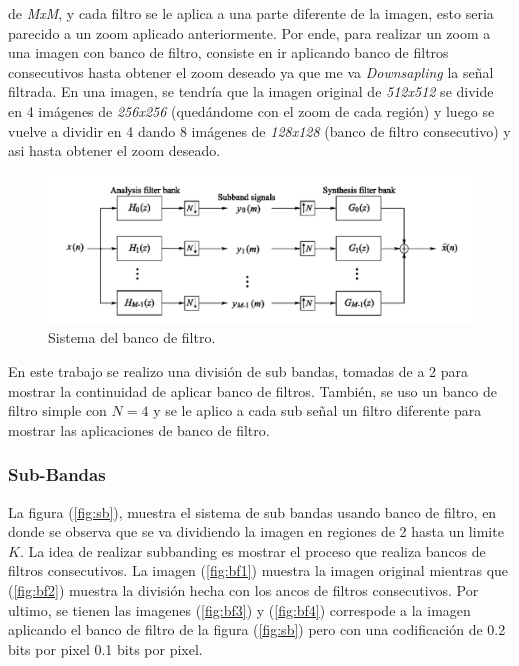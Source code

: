de \textit{MxM}, y cada filtro se le aplica a una parte diferente de la imagen, esto seria parecido a un zoom aplicado anteriormente. Por ende, para realizar un zoom a una imagen con banco de filtro, consiste en ir aplicando banco de filtros consecutivos hasta obtener el zoom deseado ya que me va \textit{Downsapling} la señal filtrada. En una imagen, se tendría que la imagen original de \textit{512x512} se divide en 4 imágenes de \textit{256x256} (quedándome con el zoom de cada región) y luego se vuelve a dividir en 4 dando 8 imágenes de \textit{128x128} (banco de filtro consecutivo) y asi hasta obtener el zoom deseado. 

\begin{figure}[H]
	\centering
	\includegraphics[scale=0.5]{imagenes/bancoFiltro.png}
	\caption{Sistema del banco de filtro\label{fig:bf}.}
\end{figure}

En este trabajo se realizo una división de sub bandas, tomadas de a 2 para mostrar la continuidad de aplicar banco de filtros. También, se uso un banco de filtro simple con $N=4$ y se le aplico a cada sub señal un filtro diferente para mostrar las aplicaciones de banco de filtro.

\subsubsection{Sub-Bandas}


	La figura (\ref{fig:sb}), muestra el sistema de sub bandas usando banco de filtro, en donde se observa que se va dividiendo la imagen en regiones de 2 hasta un limite $K$. La idea de realizar subbanding es mostrar el proceso que realiza bancos de filtros consecutivos. La imagen (\ref{fig:bf1}) muestra la imagen original mientras que (\ref{fig:bf2}) muestra la división hecha con los ancos de filtros consecutivos. Por ultimo, se tienen las imagenes (\ref{fig:bf3}) y  (\ref{fig:bf4}) correspode a la imagen aplicando el banco de filtro de la figura (\ref{fig:sb}) pero con una codificación de 0.2 bits por pixel  0.1 bits por pixel.
	
